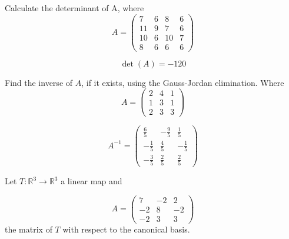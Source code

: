 \begin{questions}

\question Calculate the determinant of A, where
$$
A=\left(\begin{array}{rrrr}
7 & 6 & 8 & 6 \\
11 & 9 & 7 & 6 \\
10 & 6 & 10 & 7 \\
8 & 6 & 6 & 6
\end{array}\right)
$$

\begin{solution}
$$\det(A)=-120$$
\end{solution}

\question Find the inverse of $A$, if it exists, using the Gauss-Jordan elimination. Where
$$
A=\left(\begin{array}{rrr}
2 & 4 & 1 \\
1 & 3 & 1 \\
2 & 3 & 3
\end{array}\right)
$$

\begin{solution}
$$A^{-1}=\left(\begin{array}{rrr}
\frac{6}{5} & -\frac{9}{5} & \frac{1}{5} \\
-\frac{1}{5} & \frac{4}{5} & -\frac{1}{5} \\
-\frac{3}{5} & \frac{2}{5} & \frac{2}{5}
\end{array}\right)$$
\end{solution}

\question Let $T:\mathbb{R}^3\rightarrow\mathbb{R}^3$  a linear map and
 
$$
A=\left(\begin{array}{rrr}
7 & -2 & 2 \\
-2 & 8 & -2 \\
-2 & 3 & 3
\end{array}\right)
$$
the matrix of $T$ with respect to the canonical basis.
\end{questions}
